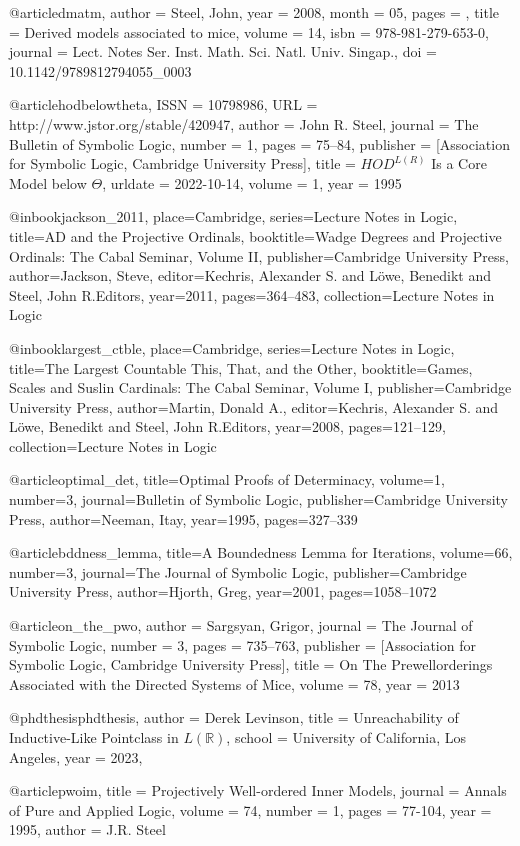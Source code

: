@article{dmatm,
author = {Steel, John},
year = {2008},
month = {05},
pages = {},
title = {Derived models associated to mice},
volume = {14},
isbn = {978-981-279-653-0},
journal = {Lect. Notes Ser. Inst. Math. Sci. Natl. Univ. Singap.},
doi = {10.1142/9789812794055_0003}
}

@article{hodbelowtheta,
 ISSN = {10798986},
 URL = {http://www.jstor.org/stable/420947},
 author = {John R. Steel},
 journal = {The Bulletin of Symbolic Logic},
 number = {1},
 pages = {75--84},
 publisher = {[Association for Symbolic Logic, Cambridge University Press]},
 title = {$HOD^{L(R)}$ Is a Core Model below $\Theta$},
 urldate = {2022-10-14},
 volume = {1},
 year = {1995}
}

@inbook{jackson_2011, place={Cambridge}, series={Lecture Notes in Logic}, title={AD and the Projective Ordinals}, booktitle={Wadge Degrees and Projective Ordinals: The Cabal Seminar, Volume II}, publisher={Cambridge University Press}, author={Jackson, Steve}, editor={Kechris, Alexander S. and Löwe, Benedikt and Steel, John R.Editors}, year={2011}, pages={364–483}, collection={Lecture Notes in Logic}}

@inbook{largest_ctble, place={Cambridge}, series={Lecture Notes in Logic}, title={The Largest Countable This, That, and the Other}, booktitle={Games, Scales and Suslin Cardinals: The Cabal Seminar, Volume I}, publisher={Cambridge University Press}, author={Martin, Donald A.}, editor={Kechris, Alexander S. and Löwe, Benedikt and Steel, John R.Editors}, year={2008}, pages={121–129}, collection={Lecture Notes in Logic}}

@article{optimal_det, title={Optimal Proofs of Determinacy}, volume={1}, number={3}, journal={Bulletin of Symbolic Logic}, publisher={Cambridge University Press}, author={Neeman, Itay}, year={1995}, pages={327–339}}

@article{bddness_lemma, title={A Boundedness Lemma for Iterations}, volume={66}, number={3}, journal={The Journal of Symbolic Logic}, publisher={Cambridge University Press}, author={Hjorth, Greg}, year={2001}, pages={1058–1072}}

@article{on_the_pwo,
 author = {Sargsyan, Grigor},
 journal = {The Journal of Symbolic Logic},
 number = {3},
 pages = {735--763},
 publisher = {[Association for Symbolic Logic, Cambridge University Press]},
 title = {On The Prewellorderings Associated with the Directed Systems of Mice},
 volume = {78},
 year = {2013}
}

@phdthesis{phdthesis,
  author       = {Derek Levinson}, 
  title        = {Unreachability of Inductive-Like Pointclass in $L(\mathbb{R})$},
  school       = {University of California, Los Angeles},
  year         = 2023,
}

@article{pwoim,
title = {Projectively Well-ordered Inner Models},
journal = {Annals of Pure and Applied Logic},
volume = {74},
number = {1},
pages = {77-104},
year = {1995},
author = {J.R. Steel}
}